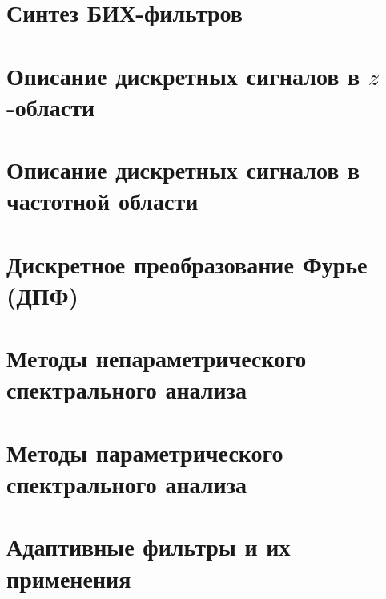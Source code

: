 \documentclass[a4paper, 14pt]{extarticle}
\begin{document}
\section{Синтез БИХ-фильтров}
\lipsum[1] %

\section{Описание дискретных сигналов в $z$-области}
\lipsum[1] %

\section{Описание дискретных сигналов в частотной области}
\lipsum[1] %

\section{Дискретное преобразование Фурье (ДПФ)}
\lipsum[1] %

\section{Методы непараметрического спектрального анализа}
\lipsum[1] %

\section{Методы параметрического спектрального анализа}
\lipsum[1] %

\section{Адаптивные фильтры и их применения}
\lipsum[1] %
\end{document}
